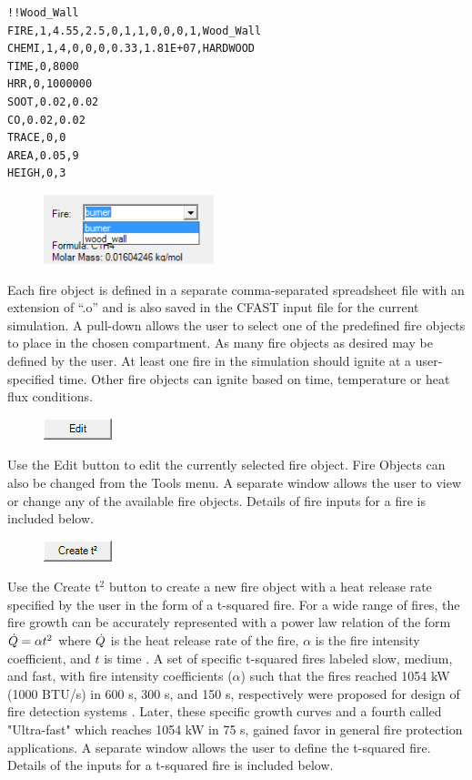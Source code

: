 \begin{lstlisting}
!!Wood_Wall
FIRE,1,4.55,2.5,0,1,1,0,0,0,1,Wood_Wall
CHEMI,1,4,0,0,0,0.33,1.81E+07,HARDWOOD
TIME,0,8000
HRR,0,1000000
SOOT,0.02,0.02
CO,0.02,0.02
TRACE,0,0
AREA,0.05,9
HEIGH,0,3
\end{lstlisting}

\begin{figure}
  \includegraphics[width=1.948in]{FIGURES/Input_File/Fire_Pulldown}
\end{figure}

Each fire object is defined in a separate comma-separated spreadsheet file with an extension of ``.o'' and is also saved in the CFAST input file for the current simulation. A pull-down allows the user to select one of the predefined fire objects to place in the chosen compartment. As many fire objects as desired may be defined by the user.  At least one fire in the simulation should ignite at a user-specified time.  Other fire objects can ignite based on time, temperature or heat flux conditions.

\begin{figure}
  \includegraphics[width=0.781in]{FIGURES/Input_File/Edit_Button}
\end{figure}

Use the Edit button to edit the currently selected fire object. Fire Objects can also be changed from the Tools menu. A separate window allows the user to view or change any of the available fire objects. Details of fire inputs for a fire is included below.

\begin{figure}
  \includegraphics[width=0.781in]{FIGURES/Input_File/Create_t2_Button}
\end{figure}

Use the Create t$^2$ button to create a new fire object with a heat release rate specified by the user in the form of a t-squared fire.  For a wide range of fires, the fire growth can be accurately represented with a power law relation of the form $\dot{Q}=\alpha t^2$  where $\dot{Q}$  is the heat release rate of the fire, $\alpha$ is the fire intensity coefficient, and $t$ is time \cite{Schifiliti:2002}. A set of specific t-squared fires labeled slow, medium, and fast, with fire intensity coefficients ($\alpha$) such that the fires reached 1054 kW (1000 BTU/s) in 600 s, 300 s, and 150 s, respectively were proposed for design of fire detection systems .  Later, these specific growth curves and a fourth called "Ultra-fast" which reaches 1054 kW in 75 s, gained favor in general fire protection applications. A separate window allows the user to define the t-squared fire. Details of the inputs for a t-squared fire is included below.

